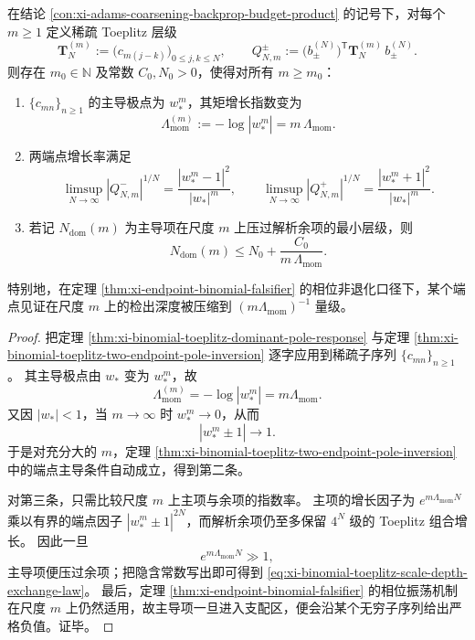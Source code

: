 \begin{theorem}\label{thm:xi-binomial-toeplitz-scale-depth-exchange}
在结论 \ref{con:xi-adams-coarsening-backprop-budget-product} 的记号下，对每个 \(m\ge 1\) 定义稀疏 Toeplitz 层级
\[
\mathbf T_N^{(m)}:=\bigl(c_{m(j-k)}\bigr)_{0\le j,k\le N},
\qquad
Q_{N,m}^{\pm}:=\bigl(b_{\pm}^{(N)}\bigr)^{\mathsf T}\mathbf T_N^{(m)}\,b_{\pm}^{(N)}.
\]
则存在 \(m_0\in\mathbb N\) 及常数 \(C_0,N_0>0\)，使得对所有 \(m\ge m_0\)：
\begin{enumerate}
  \item \(\{c_{mn}\}_{n\ge 1}\) 的主导极点为 \(w_\ast^m\)，其矩增长指数变为
  \[
  \boxed{\;
  \Lambda_{\mathrm{mom}}^{(m)}
  :=-\log|w_\ast^m|
  =m\,\Lambda_{\mathrm{mom}}.
  \;}
  \]
  \item 两端点增长率满足
  \[
  \limsup_{N\to\infty}|Q_{N,m}^-|^{1/N}
  =\frac{|w_\ast^m-1|^2}{|w_\ast|^m},
  \qquad
  \limsup_{N\to\infty}|Q_{N,m}^+|^{1/N}
  =\frac{|w_\ast^m+1|^2}{|w_\ast|^m}.
  \]
  \item 若记 \(N_{\mathrm{dom}}(m)\) 为主导项在尺度 \(m\) 上压过解析余项的最小层级，则
  \begin{equation}\label{eq:xi-binomial-toeplitz-scale-depth-exchange-law}
  \boxed{\;
  N_{\mathrm{dom}}(m)\le N_0+\frac{C_0}{m\,\Lambda_{\mathrm{mom}}}.
  \;}
  \end{equation}
\end{enumerate}
特别地，在定理 \ref{thm:xi-endpoint-binomial-falsifier} 的相位非退化口径下，某个端点见证在尺度 \(m\) 上的检出深度被压缩到 \((m\Lambda_{\mathrm{mom}})^{-1}\) 量级。
\end{theorem}

\begin{proof}
把定理 \ref{thm:xi-binomial-toeplitz-dominant-pole-response} 与定理 \ref{thm:xi-binomial-toeplitz-two-endpoint-pole-inversion} 逐字应用到稀疏子序列 \(\{c_{mn}\}_{n\ge 1}\)。
其主导极点由 \(w_\ast\) 变为 \(w_\ast^m\)，故
\[
\Lambda_{\mathrm{mom}}^{(m)}=-\log|w_\ast^m|=m\Lambda_{\mathrm{mom}}.
\]
又因 \(|w_\ast|<1\)，当 \(m\to\infty\) 时 \(w_\ast^m\to 0\)，从而
\[
|w_\ast^m\pm 1|\to 1.
\]
于是对充分大的 \(m\)，定理 \ref{thm:xi-binomial-toeplitz-two-endpoint-pole-inversion} 中的端点主导条件自动成立，得到第二条。
\par
对第三条，只需比较尺度 \(m\) 上主项与余项的指数率。
主项的增长因子为 \(e^{m\Lambda_{\mathrm{mom}}N}\) 乘以有界的端点因子 \(|w_\ast^m\pm 1|^{2N}\)，而解析余项仍至多保留 \(4^N\) 级的 Toeplitz 组合增长。
因此一旦
\[
e^{m\Lambda_{\mathrm{mom}}N}\gg 1,
\]
主导项便压过余项；把隐含常数写出即可得到 \eqref{eq:xi-binomial-toeplitz-scale-depth-exchange-law}。
最后，定理 \ref{thm:xi-endpoint-binomial-falsifier} 的相位振荡机制在尺度 \(m\) 上仍然适用，故主导项一旦进入支配区，便会沿某个无穷子序列给出严格负值。证毕。
\end{proof}

